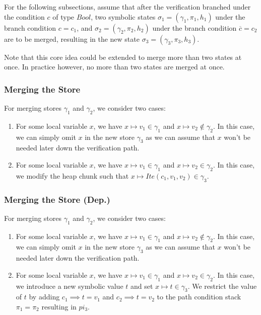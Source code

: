\documentclass[11pt]{article}
\begin{document}
    For the following subsections, assume that after the verification branched under the condition $c$ of type $Bool$,
    two symbolic states $\sigma_1 = (\gamma_1, \pi_1, h_1)$ under the branch condition $c = c_1$, and
    $\sigma_2 = (\gamma_2, \pi_2, h_2)$ under the branch condition $\overline{c} = c_2$ are to be merged,
    resulting in the new state $\sigma_3 = (\gamma_3, \pi_3, h_3)$.

    Note that this core idea could be extended to merge more than two states at once. In practice however,
    no more than two states are merged at once.

    \subsubsection{Merging the Store}

    For merging stores $\gamma_1$ and $\gamma_2$, we consider two cases:

    \begin{enumerate}
        \item For some local variable $x$, we have $x \mapsto v_1 \in \gamma_1$ and $x \mapsto v_2 \notin \gamma_2$.
            In this case, we can simply omit $x$ in the new store $\gamma_3$ as we can assume that $x$ won't
            be needed later down the verification path.
        \item For some local variable $x$, we have $x \mapsto v_1 \in \gamma_1$ and $x \mapsto v_2 \in \gamma_2$.
            In this case, we modify the heap chunk such that $x \mapsto Ite(c_1, v_1, v_2) \in \gamma_3$.
    \end{enumerate}

    \subsubsection{Merging the Store (Dep.)}

    For merging stores $\gamma_1$ and $\gamma_2$, we consider two cases:

    \begin{enumerate}
        \item For some local variable $x$, we have $x \mapsto v_1 \in \gamma_1$ and $x \mapsto v_2 \notin \gamma_2$.
            In this case, we can simply omit $x$ in the new store $\gamma_3$ as we can assume that $x$ won't
            be needed later down the verification path.
        \item For some local variable $x$, we have $x \mapsto v_1 \in \gamma_1$ and $x \mapsto v_2 \in \gamma_2$.
            In this case, we introduce a new symbolic value $t$ and set $x \mapsto t \in \gamma_3$. We restrict the
            value of $t$ by adding $c_1 \implies t = v_1$ and $c_2 \implies t = v_2$ to the path condition
            stack $\pi_1 = \pi_2$ resulting in $pi_3$.
    \end{enumerate}
\end{document}
